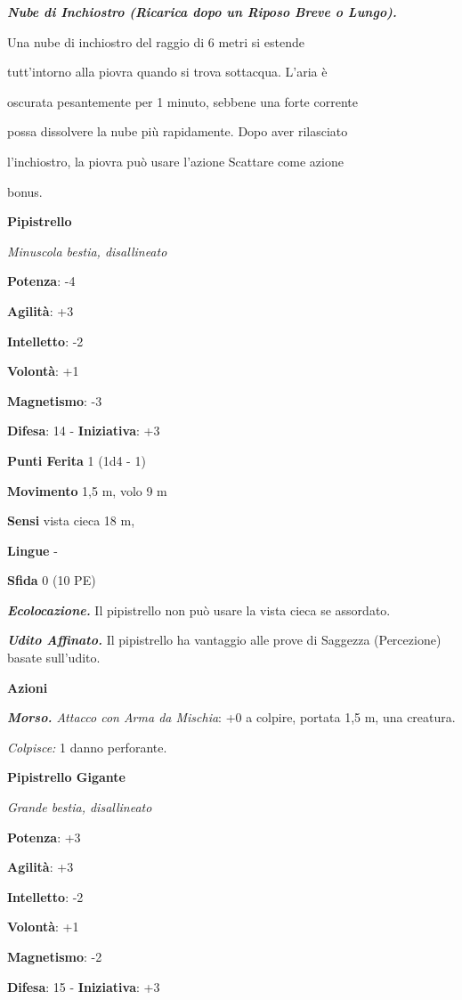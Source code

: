 \begin{multicols}{2}
\emph{\textbf{Nube di Inchiostro (Ricarica dopo un Riposo Breve o
Lungo).}}

Una nube di inchiostro del raggio di 6 metri si estende

tutt'intorno alla piovra quando si trova sottacqua. L'aria è

oscurata pesantemente per 1 minuto, sebbene una forte corrente

possa dissolvere la nube più rapidamente. Dopo aver rilasciato

l'inchiostro, la piovra può usare l'azione Scattare come azione

bonus.

\textbf{Pipistrello}

\emph{Minuscola bestia, disallineato}

\textbf{Potenza}: -4

\textbf{Agilità}: +3

\textbf{Intelletto}: -2

\textbf{Volontà}: +1

\textbf{Magnetismo}: -3

\textbf{Difesa}: 14 - \textbf{Iniziativa}: +3

\textbf{Punti Ferita} 1 (1d4 - 1)

\textbf{Movimento} 1,5 m, volo 9 m

\textbf{Sensi} vista cieca 18 m, 

\textbf{Lingue} -

\textbf{Sfida} 0 (10 PE)

\emph{\textbf{Ecolocazione.}} Il pipistrello non può usare la vista
cieca se assordato.

\emph{\textbf{Udito Affinato.}} Il pipistrello ha vantaggio alle prove
di Saggezza (Percezione) basate sull'udito.

\textbf{Azioni}

\emph{\textbf{Morso.} Attacco con Arma da Mischia}: +0 a colpire,
portata 1,5 m, una creatura.

\emph{Colpisce:} 1 danno perforante.

\textbf{Pipistrello Gigante}

\emph{Grande bestia, disallineato}

\textbf{Potenza}: +3

\textbf{Agilità}: +3

\textbf{Intelletto}: -2

\textbf{Volontà}: +1

\textbf{Magnetismo}: -2

\textbf{Difesa}: 15 - \textbf{Iniziativa}: +3


\end{multicols}
